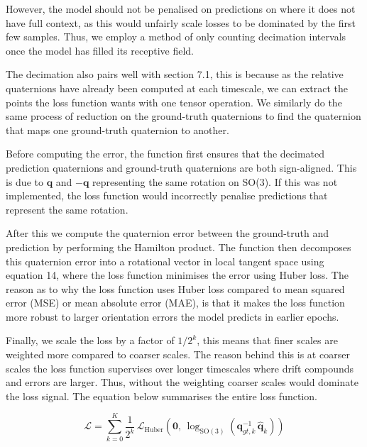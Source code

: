 However, the model should not be penalised on predictions on where it does not have full context, as this would unfairly scale losses to be dominated by the 
first few samples. Thus, we employ a method of only counting decimation intervals once the model has filled its receptive field.

The decimation also pairs well with section 7.1, this is because as the relative quaternions have already been computed at each timescale, we can extract 
the points the loss function wants with one tensor operation. We similarly do the same process of reduction on the ground-truth quaternions to find the quaternion
that maps one ground-truth quaternion to another. 

Before computing the error, the function first ensures that the decimated prediction quaternions and ground-truth quaternions are both sign-aligned. This is due 
to $\mathbf{q}$ and $\mathbf{-q}$ representing the same rotation on SO(3). If this was not implemented, the loss function would incorrectly penalise 
predictions that represent the same rotation. 

After this we compute the quaternion error between the ground-truth and prediction by 
performing the Hamilton product. The function then decomposes this quaternion error into a rotational vector in local tangent space using equation 14, 
where the loss function minimises the error using Huber loss. The reason as to why the loss function uses Huber loss compared to mean squared error (MSE) 
or mean absolute error (MAE), is that it makes the loss function more robust to larger orientation errors the model predicts in earlier epochs.

Finally, we scale the loss by a factor of $1/2^k$, this means that finer scales are weighted more compared to coarser scales. The reason behind this is at 
coarser scales the loss function supervises over longer timescales where drift compounds and errors are larger. Thus, without the weighting coarser scales
would dominate the loss signal. The equation below summarises the entire loss function. 

\begin{equation}
    \mathcal{L} = \sum_{k=0}^{K} \frac{1}{2^k}\, \mathcal{L}_{\text{Huber}}\!\left(\mathbf{0},\, \log_{\mathrm{SO(3)}}\!\left(\mathbf{q}^{-1}_{gt,k}\, \hat{\mathbf{q}}_k\right)\right)
\end{equation}
